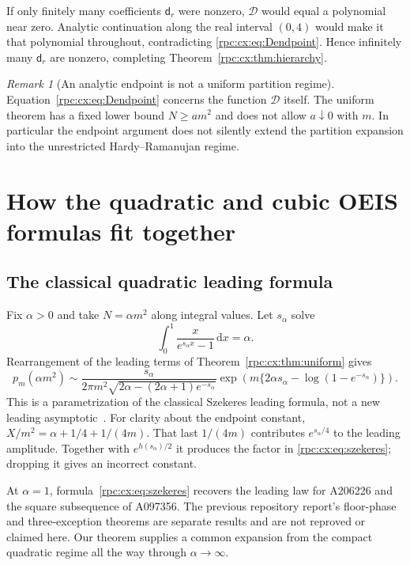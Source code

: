 \documentclass[11pt]{article}
\theoremstyle{definition}
\theoremstyle{remark}
\newtheorem{remark}[theorem]{Remark}
\newcommand{\dd}{\,\mathrm d}
\numberwithin{equation}{section}
\begin{document}
If only finitely many coefficients $\mathsf d_r$ were nonzero, $\mathcal D$ would equal a
polynomial near zero. Analytic continuation along the real interval
$(0,4)$ would make it that polynomial throughout, contradicting
\eqref{rpc:cx:eq:Dendpoint}. Hence infinitely many $\mathsf d_r$ are nonzero, completing
Theorem~\ref{rpc:cx:thm:hierarchy}.

\begin{remark}[An analytic endpoint is not a uniform partition regime]
Equation~\eqref{rpc:cx:eq:Dendpoint} concerns the function $\mathcal D$ itself.
The uniform theorem has a fixed lower bound $N\ge am^2$ and does not
allow $a\downarrow0$ with $m$. In particular the endpoint argument does
not silently extend the partition expansion into the unrestricted
Hardy--Ramanujan regime.
\end{remark}

\section{How the quadratic and cubic OEIS formulas fit together}
\label{rpc:cx:sec:oeis}

\subsection{The classical quadratic leading formula}
Fix $\alpha>0$ and take $N=\alpha m^2$ along integral values.
Let $s_\alpha$ solve
\begin{equation}
 \int_0^1\frac{x}{e^{s_\alpha x}-1}\dd x=\alpha.
\end{equation}
Rearrangement of the leading terms of Theorem~\ref{rpc:cx:thm:uniform} gives
\begin{equation}\label{rpc:cx:eq:szekeres}
 p_m(\alpha m^2)\sim
 \frac{s_\alpha}{2\pi m^2
 \sqrt{2\alpha-(2\alpha+1)e^{-s_\alpha}}}
 \exp\!\left(m\{2\alpha s_\alpha
                    -\log(1-e^{-s_\alpha})\}\right).
\end{equation}
This is a parametrization of the classical Szekeres leading formula,
not a new leading asymptotic~\cite{canfield}.
For clarity about the endpoint constant, $X/m^2=\alpha+1/4+1/(4m)$.
That last $1/(4m)$ contributes $e^{s_\alpha/4}$ to the leading
amplitude. Together with $e^{h(s_\alpha)/2}$ it produces the
factor in \eqref{rpc:cx:eq:szekeres}; dropping it gives an incorrect constant.

At $\alpha=1$, formula~\eqref{rpc:cx:eq:szekeres} recovers the leading law
for A206226 and the square subsequence of A097356. The previous
repository report's floor-phase and three-exception theorems are
separate results and are not reproved or claimed here. Our theorem
supplies a common expansion from the compact quadratic regime all the
way through $\alpha\to\infty$.
\end{document}
